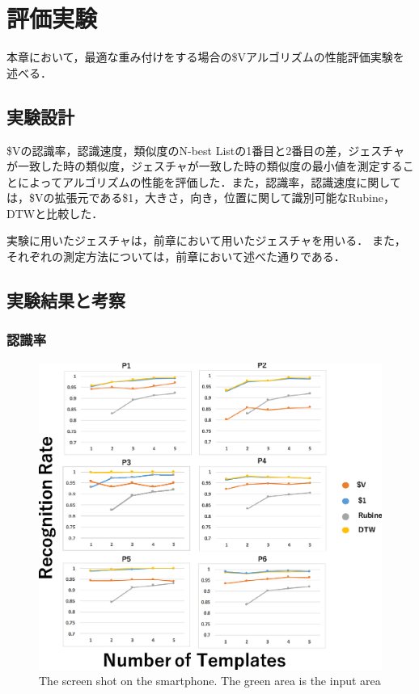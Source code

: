 \chapter{評価実験}
本章において，最適な重み付けをする場合の\$Vアルゴリズムの性能評価実験を述べる．

\section{実験設計}
\$Vの認識率，認識速度，類似度のN-best Listの1番目と2番目の差，ジェスチャが一致した時の類似度，ジェスチャが一致した時の類似度の最小値を測定することによってアルゴリズムの性能を評価した．また，認識率，認識速度に関しては，\$Vの拡張元である\$1，大きさ，向き，位置に関して識別可能なRubine，DTWと比較した．

実験に用いたジェスチャは，前章において用いたジェスチャを用いる．
また，それぞれの測定方法については，前章において述べた通りである．

\section{実験結果と考察}
\subsection{認識率}
\begin{figure}[!h]
\centering
\includegraphics[width=1.0\columnwidth]{img/rec_rate.eps}
\caption{The screen shot on the smartphone. The green area is the input area}
\label{fig:rare_rec}
\end{figure}


